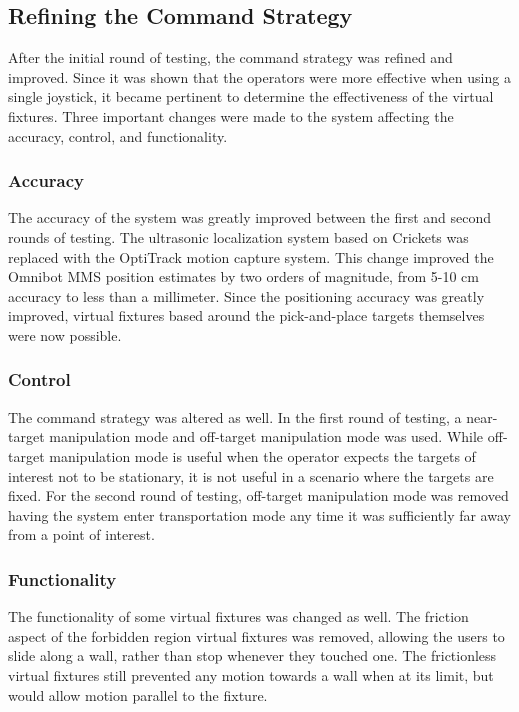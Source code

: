 \documentclass[onecolumn,10pt,final]{asme2ej}
\begin{document}
\subsection{Refining the Command Strategy}

After the initial round of testing, the command strategy was refined and improved. Since it was shown that the operators were more effective when using a single joystick, it became pertinent to determine the effectiveness of the virtual fixtures. Three important changes were made to the system affecting the accuracy, control, and functionality.

\subsubsection{Accuracy}

The accuracy of the system was greatly improved between the first and second rounds of testing. The ultrasonic localization system based on Crickets was replaced with the OptiTrack motion capture system. This change improved the Omnibot MMS position estimates by two orders of magnitude, from 5-10 cm accuracy to less than a millimeter. Since the positioning accuracy was greatly improved, virtual fixtures based around the pick-and-place targets themselves were now possible.\\

\subsubsection{Control}

The command strategy was altered as well. In the first round of testing, a near-target manipulation mode and off-target manipulation mode was used. While off-target manipulation mode is useful when the operator expects the targets of interest not to be stationary, it is not useful in a scenario where the targets are fixed. For the second round of testing, off-target manipulation mode was removed having the system enter transportation mode any time it was sufficiently far away from a point of interest.\\

\subsubsection{Functionality}

The functionality of some virtual fixtures was changed as well. The friction aspect of the forbidden region virtual fixtures was removed, allowing the users to slide along a wall, rather than stop whenever they touched one. The frictionless virtual fixtures still prevented any motion towards a wall when at its limit, but would allow motion parallel to the fixture.\\
\end{document}
